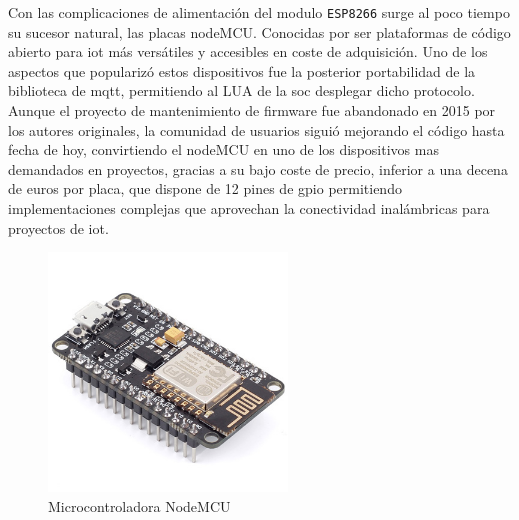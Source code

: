 \vspace{1cm}

Con las complicaciones de alimentación del modulo \verb|ESP8266| surge al poco tiempo su sucesor natural, las placas nodeMCU. Conocidas por ser plataformas de código abierto para \gls{iot} más versátiles y accesibles en coste de adquisición. Uno de los aspectos que popularizó estos dispositivos fue la posterior portabilidad de la biblioteca de \gls{mqtt}, permitiendo al LUA de la \gls{soc} desplegar dicho protocolo. Aunque el proyecto de mantenimiento de firmware fue abandonado en 2015 por los autores originales, la comunidad de usuarios siguió mejorando el código hasta fecha de hoy, convirtiendo el nodeMCU en uno de los dispositivos mas demandados en proyectos, gracias a su bajo coste de precio, inferior a una decena de euros por placa, que dispone de 12 pines de \gls{gpio} permitiendo implementaciones complejas que aprovechan la conectividad inalámbricas para proyectos de \gls{iot}.

\begin{figure}[hbt!]
\centering
\includegraphics[height=2.5in]{figures/nodemcu.jpg}
\caption[captura de una nodeMCU]{Microcontroladora NodeMCU\footnotemark}
\end{figure}